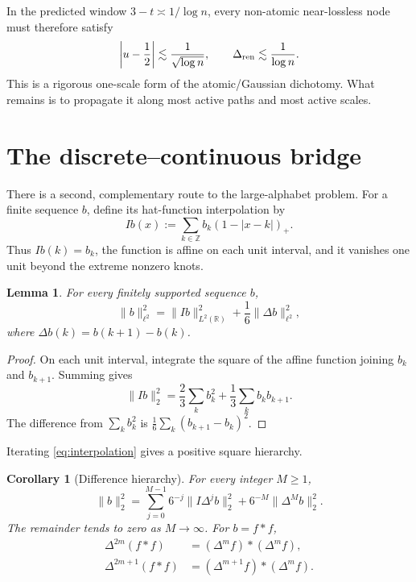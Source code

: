 \documentclass[11pt,reqno]{amsart}
\numberwithin{equation}{section}
\newtheorem{lemma}[lemma]{Lemma}
\newtheorem{corollary}[corollary]{Corollary}
\theoremstyle{definition}
\theoremstyle{remark}
\newcommand{\R}{\mathbb R}
\newcommand{\Z}{\mathbb Z}
\newcommand{\norm}[1]{\lVert #1\rVert}
\begin{document}
In the predicted window $3-t\asymp1/\log n$, every non-atomic near-lossless
node must therefore satisfy
\[
  \left|u-\frac12\right|\lesssim\frac1{\sqrt{\log n}},
  \qquad
  \Delta_{\rm ren}\lesssim\frac1{\log n}.
\]
This is a rigorous one-scale form of the atomic/Gaussian dichotomy.  What
remains is to propagate it along most active paths and most active scales.

\section{The discrete--continuous bridge}

There is a second, complementary route to the large-alphabet problem.
For a finite sequence $b$, define its hat-function interpolation by
\begin{equation}\label{eq:I-definition}
  Ib(x):=\sum_{k\in\Z}b_k(1-|x-k|)_+.
\end{equation}
Thus $Ib(k)=b_k$, the function is affine on each unit interval, and it
vanishes one unit beyond the extreme nonzero knots.

\begin{lemma}\label{lem:interpolation}
For every finitely supported sequence $b$,
\begin{equation}\label{eq:interpolation}
  \boxed{
  \norm b_{\ell^2}^2
  =\norm{Ib}_{L^2(\R)}^2
   +\frac16\norm{\Delta b}_{\ell^2}^2,}
\end{equation}
where $\Delta b(k)=b(k+1)-b(k)$.
\end{lemma}

\begin{proof}
On each unit interval, integrate the square of the affine function joining
$b_k$ and $b_{k+1}$.  Summing gives
\[
  \norm{Ib}_2^2
  =\frac23\sum_k b_k^2+\frac13\sum_kb_kb_{k+1}.
\]
The difference from $\sum_kb_k^2$ is
$\frac16\sum_k(b_{k+1}-b_k)^2$.
\end{proof}

Iterating \eqref{eq:interpolation} gives a positive square hierarchy.

\begin{corollary}[Difference hierarchy]\label{cor:difference-hierarchy}
For every integer $M\ge1$,
\begin{equation}\label{eq:difference-hierarchy}
  \norm b_2^2
  =\sum_{j=0}^{M-1}6^{-j}\norm{I\Delta^j b}_2^2
   +6^{-M}\norm{\Delta^M b}_2^2.
\end{equation}
The remainder tends to zero as $M\to\infty$.  For $b=f*f$,
\begin{align}
  \Delta^{2m}(f*f)&=(\Delta^m f)*(\Delta^m f),\label{eq:even-diff-conv}\\
  \Delta^{2m+1}(f*f)&=(\Delta^{m+1}f)*(\Delta^m f).
  \label{eq:odd-diff-conv}
\end{align}
\end{corollary}
\end{document}
